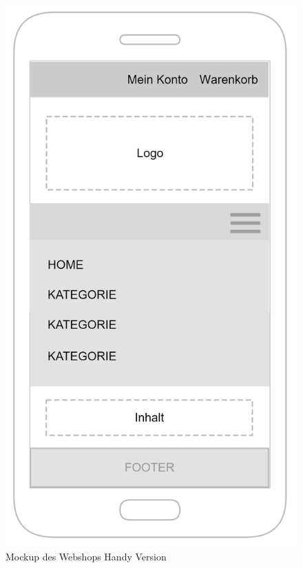 \begin{figure}[ht!]
	\centering
	\includegraphics[width=0.35\linewidth]{bilder/kap6/mockup_mobile.png}
	\caption{Mockup des Webshops Handy Version}
	\label{fig:mockup_mobile}
\end{figure}